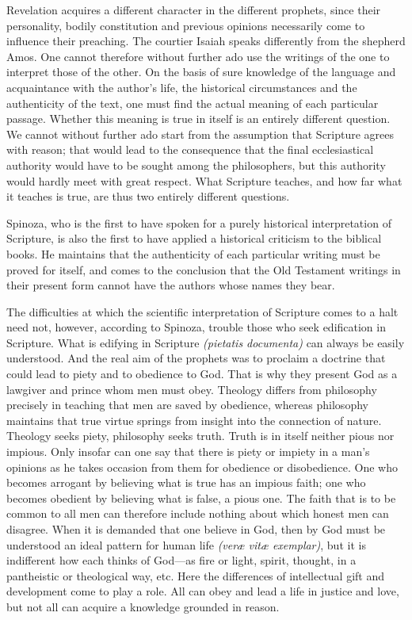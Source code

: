 \documentclass[12pt]{book}
\newcommand{\opage}[1]{\marginnote{\footnotesize\textit{[#1]}}}
\begin{document}
Revelation acquires a different character in the different prophets, since their
personality, bodily constitution and previous opinions necessarily come to influence
their preaching. The courtier Isaiah speaks differently from the shepherd Amos. One cannot
therefore without further ado use the writings of the one to \opage{158}interpret those
of the other. On the basis of sure knowledge of the language and acquaintance with the
author's life, the historical circumstances and the authenticity of the text, one must
find the actual meaning of each particular passage. Whether this meaning is true in
itself is an entirely different question. We cannot without further ado start from the
assumption that Scripture agrees with reason; that would lead to the consequence that the
final ecclesiastical authority would have to be sought among the philosophers, but this
authority would hardly meet with great respect. What Scripture teaches, and how far what
it teaches is true, are thus two entirely different questions.

Spinoza, who is the first to have spoken for a purely historical interpretation of
Scripture, is also the first to have applied a historical criticism to the biblical
books. He maintains that the authenticity of each particular writing must be proved for
itself, and comes to the conclusion that the Old Testament writings in their present form
cannot have the authors whose names they bear.

The difficulties at which the scientific interpretation of Scripture comes to a halt
need not, however, according to Spinoza, trouble those who seek edification in
Scripture. What is edifying in Scripture \textit{(pietatis documenta)} can always be
easily understood. And the real aim of the prophets was to proclaim a doctrine that could
lead to piety and to obedience to God. That is why they present God as a lawgiver and
prince whom men must obey. Theology differs from philosophy precisely in teaching that men
are saved by obedience, whereas philosophy maintains that true virtue springs
\opage{159}from insight into the connection of nature. Theology seeks piety, philosophy
seeks truth. Truth is in itself neither pious nor impious. Only insofar can one say that
there is piety or impiety in a man's opinions as he takes occasion from them for
obedience or disobedience. One who becomes arrogant by believing what is true has an
impious faith; one who becomes obedient by believing what is false, a pious one. The
faith that is to be common to all men can therefore include nothing about which honest
men can disagree. When it is demanded that one believe in God, then by God must be
understood an ideal pattern for human life \textit{(veræ vitæ exemplar)}, but it is
indifferent how each thinks of God---as fire or light, spirit, thought, in a pantheistic
or theological way, etc. Here the differences of intellectual gift and development come
to play a role. All can obey and lead a life in justice and love, but not all can acquire
a knowledge grounded in reason.
\end{document}
